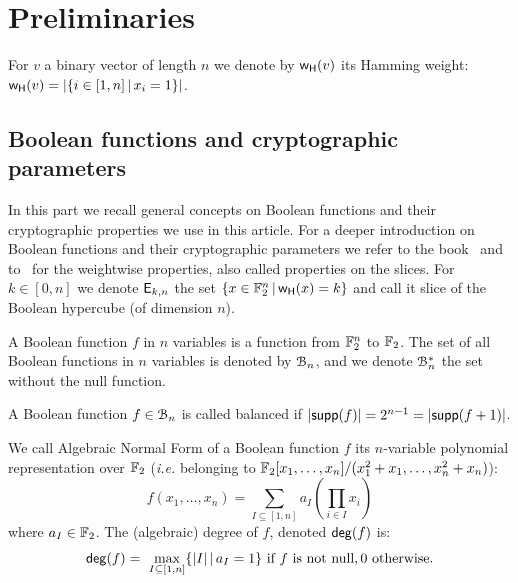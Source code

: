 \documentclass[11pt]{llncs}
\begin{document}
\section{Preliminaries}

For $v$ a binary vector of length $n$ we denote by $\mathsf{w_H}(v)$ its Hamming weight: $\mathsf{w_H}(v)=|\{i\in [1,n] \, | \, x_i=1\}|$.



\subsection{Boolean functions and cryptographic parameters}

In this part we recall general concepts on Boolean functions and their cryptographic properties we use in this article. 
For a deeper introduction on Boolean functions and their cryptographic parameters we refer to the book~\cite{Carlet20} and to~\cite{TOSC:CarMeaRot17} for the weightwise properties, also called properties on the slices.
For $k \in [0,n]$ we denote $\mathsf{E}_{k,n}$ the set $\{x\in \mathbb{F}_2^n \, | \, \mathsf{w_H}(x)=k  \}$ and call it slice of the Boolean hypercube (of dimension $n$). 


\begin{definition}\label{def:bool_f}
	A Boolean function $f$ in $n$ variables is a function from $\mathbb{F}_2^n$ to $\mathbb{F}_2$. 
	The set of all Boolean functions in $n$ variables is denoted by $\mathcal{B}_n$, and we denote $\mathcal{B}_n^*$ the set without the null function.
\end{definition}


\begin{definition}[Balancedness]\label{def:balancedness}
	A Boolean function $f\in \mathcal{B}_n$ is called balanced if $|\mathsf{supp}(f)|=2^{n-1}=|\mathsf{supp}(f+1)|$. 
	
\end{definition}

\begin{definition}\label{def:anf}
	We call Algebraic Normal Form of a Boolean function $f$ its $n$-variable polynomial representation over $\mathbb{F}_2$ (\textit{i.e.} belonging to $\mathbb{F}_2[x_1,\dots,x_n]/(x_1^2+x_1,\dots,x_n^2+x_n)$):
	\[f(x_1,\dots,x_n)= \sum_{I \subseteq [1,n]} a_I \left( \prod_{i \in I} x_i \right) \]%
	where $a_I\in \mathbb{F}_2$. 	
	The (algebraic) degree of $f$, denoted $\mathsf{deg}(f)$ is: \[\mathsf{deg}(f)=\
	\max_{I\subseteq [1,n]}\{ |I|\, | \, a_I=1\}  \text{ if $f$ is not null},0  \text{ otherwise}.\]
\end{definition}
\end{document}
